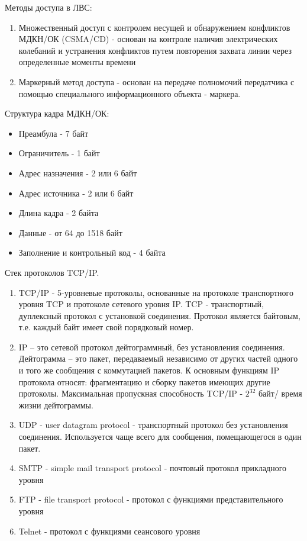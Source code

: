 \documentclass[unicode, 12pt, a4paper, oneside]{article}
\begin{document}
Методы доступа в ЛВС:
\begin{enumerate}
\item Множественный доступ с контролем несущей и обнаружением конфликтов МДКН/ОК (CSMA/CD) - основан на контроле наличия электрических колебаний и устранения конфликтов путем повторения захвата линии через определенные моменты времени
\item Маркерный метод доступа - основан на передаче полномочий передатчика с помощью специального информационного объекта - маркера.
\end{enumerate}

Структура кадра МДКН/ОК:
\begin{itemize}
\item Преамбула - 7 байт
\item Ограничитель - 1 байт
\item Адрес назначения - 2 или 6 байт
\item Адрес источника - 2 или 6 байт
\item Длина кадра - 2 байта
\item Данные - от 64 до 1518 байт
\item Заполнение и контрольный код - 4 байта
\end{itemize}

Стек протоколов TCP/IP.

\begin{enumerate}
\item TCP/IP - 5-уровневые протоколы, основанные на протоколе транспортного уровня TCP и протоколе сетевого уровня  IP. TCP - транспортный, дуплексный протокол с установкой соединения. Протокол является байтовым, т.е. каждый байт имеет свой порядковый номер.
\item IP – это сетевой протокол дейтограммный, без установления соединения. Дейтограмма – это пакет, передаваемый независимо от других частей одного и того же сообщения с коммутацией пакетов. К основным функциям IP протокола относят: фрагментацию и сборку пакетов имеющих другие протоколы. Максимальная пропускная способность TCP/IP - $2^{32}$ байт/ время жизни дейтограммы.
\item UDP - user datagram protocol - транспортный протокол без установления соединения. Используется чаще всего для сообщения, помещающегося в один пакет.
\item SMTP - simple mail transport protocol - почтовый протокол прикладного уровня
\item FTP - file transport protocol - протокол с функциями представительного уровня
\item Telnet - протокол с функциями сеансового уровня
\end{enumerate}
\end{document}
